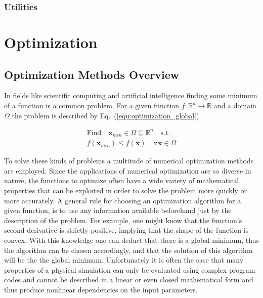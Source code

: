 \documentclass[a4paper,10pt]{article}
\renewcommand{\vec}[1]{\mathbf{#1}}
\newcommand{\equref}[1]{Eq.~(\ref{#1})}
\begin{document}
    \subsubsection{Utilities} \label{sec:utilities}
    
    \section{Optimization}

    \subsection{Optimization Methods Overview} \label{sec:opt_overview}

    In fields like scientific computing and artificial intelligence
    finding some minimum of a function is a common problem.
    For a given function $f : \mathbb{R}^n \rightarrow \mathbb{R}$ 
    and a domain $\Omega$ the problem is described by 
    \equref{equ:optimization_global}.

    \begin{equation}
        \label{equ:optimization_global}
        \begin{gathered}
        \text{Find} \quad \vec{x}_{min} \in \Omega \subseteq \mathbb{R}^n \quad \text{s.t.}\\
        f(\vec{x}_{min}) \leq f(\vec{x}) \quad \forall \vec{x} \in \Omega
        \end{gathered} 
    \end{equation}

    To solve these kinds of problems a multitude of numerical
    optimization methods are employed.
    Since the applications of numerical optimization are so diverse
    in nature, the functions to optimize often have a wide variety
    of mathematical properties that can be exploited in order to solve
    the problem more quickly or more accurately.
    A general rule for choosing an optimization algorithm for a given
    function, is to use any information available beforehand just by the
    description of the problem.
    For example, one might know that the function's second derivative is
    strictly positive, implying that the shape of the function is convex.
    With this knowledge one can deduct that there is a global minimum, 
    thus the algorithm can be chosen accordingly, and that the 
    solution of this algorithm will be the the global minimum.
    Unfortunately it is often the case that many properties of a 
    physical simulation can only be evaluated using
    complex program codes and cannot be described in a linear or 
    even closed mathematical form and thus produce nonlinear
    dependencies on the input parameters.
\end{document}
